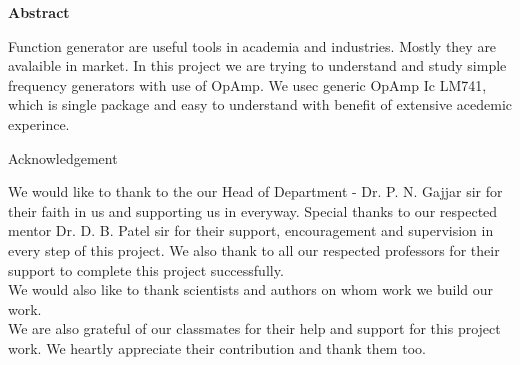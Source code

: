 \documentclass[14pt,a4paper]{extarticle}
\begin{document}
\vspace*{\fill}
\begin{center}
\colorbox{bg1}{ \begin{minipage}{.95\textwidth}\centering \vspace{1.5cm} \Large \textbf{Abstract}\\
\begin{minipage}{0.8\textwidth} \vspace{.8cm} \normalsize Function generator are useful tools in academia and industries. Mostly they are avalaible in market. In this project we are trying to understand and study simple frequency generators with use of OpAmp. We usec generic OpAmp Ic LM741, which is single package and easy to understand with benefit of extensive acedemic experince. \vspace{1.5cm} \end{minipage}
\end{minipage}}
\end{center}
\vspace*{\fill}
\pagebreak

\vspace*{\fill}
\begin{center}
\begin{huge}
Acknowledgement\\
\end{huge}
\end{center}
\vspace{2cm}
\begin{large}
We would like to thank to the our Head of Department
- Dr. P. N. Gajjar sir for their faith in us and
supporting us in everyway. Special thanks to our
respected mentor Dr. D. B. Patel sir for their support,
encouragement and supervision in every step of this
project. We also thank to all our respected professors
for their support to complete this project successfully.\\
We would also like to thank scientists and authors on
whom work we build our work.\\
We are also grateful of our classmates for their help
and support for this project work. We heartly
appreciate their contribution and thank them too.\\
\end{large}

\vspace*{\fill}
\pagebreak


\renewcommand*\contentsname{Table Of Contents}
\tableofcontents
\pagebreak
{} 
\setcounter{page}{1}
\end{document}
